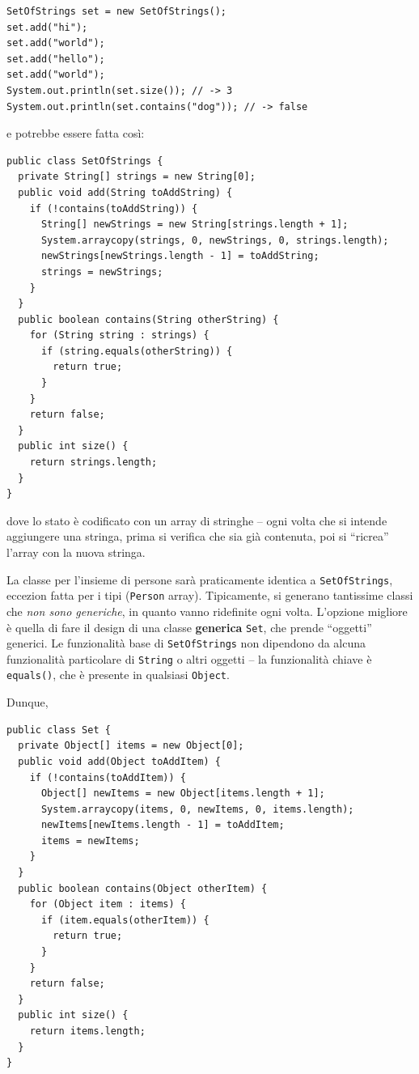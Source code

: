 \documentclass[\fontsizeclass,twocolumn]{\classname}
\theoremstyle{definition}
\theoremstyle{definition}
\begin{document}
\begin{lstlisting}
SetOfStrings set = new SetOfStrings();
set.add("hi");
set.add("world");
set.add("hello");
set.add("world");
System.out.println(set.size()); // -> 3
System.out.println(set.contains("dog")); // -> false
\end{lstlisting}

e potrebbe essere fatta così:

\begin{lstlisting}
public class SetOfStrings {
  private String[] strings = new String[0];
  public void add(String toAddString) {
    if (!contains(toAddString)) {
      String[] newStrings = new String[strings.length + 1];
      System.arraycopy(strings, 0, newStrings, 0, strings.length);
      newStrings[newStrings.length - 1] = toAddString;
      strings = newStrings;
    }
  }
  public boolean contains(String otherString) {
    for (String string : strings) {
      if (string.equals(otherString)) {
        return true;
      }
    }
    return false;
  }
  public int size() {
    return strings.length;
  }
}
\end{lstlisting}

dove lo stato è codificato con un array di stringhe -- ogni volta che si
intende aggiungere una stringa, prima si verifica che sia già contenuta, poi si
``ricrea'' l'array con la nuova stringa.

La classe per l'insieme di persone sarà praticamente identica a
\texttt{SetOfStrings}, eccezion fatta per i tipi (\texttt{Person} array).
Tipicamente, si generano tantissime classi che \emph{non sono generiche}, in
quanto vanno ridefinite ogni volta. L'opzione migliore è quella di fare il
design di una classe \textbf{generica} \texttt{Set}, che prende ``oggetti''
generici. Le funzionalità base di \texttt{SetOfStrings} non dipendono da alcuna
funzionalità particolare di \texttt{String} o altri oggetti -- la funzionalità
chiave è \texttt{equals()}, che è presente in qualsiasi \texttt{Object}.

Dunque,

\begin{lstlisting}
public class Set {
  private Object[] items = new Object[0];
  public void add(Object toAddItem) {
    if (!contains(toAddItem)) {
      Object[] newItems = new Object[items.length + 1];
      System.arraycopy(items, 0, newItems, 0, items.length);
      newItems[newItems.length - 1] = toAddItem;
      items = newItems;
    }
  }
  public boolean contains(Object otherItem) {
    for (Object item : items) {
      if (item.equals(otherItem)) {
        return true;
      }
    }
    return false;
  }
  public int size() {
    return items.length;
  }
}
\end{lstlisting}
\end{document}
